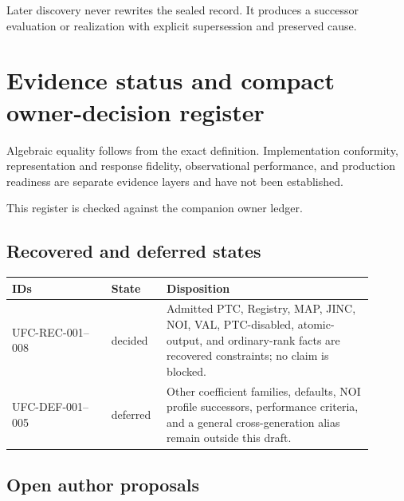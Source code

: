 Later discovery never rewrites the sealed record. It produces a successor
evaluation or realization with explicit supersession and preserved cause.

\section{Evidence status and compact owner-decision register}

Algebraic equality follows from the exact definition. Implementation
conformity, representation and response fidelity, observational performance,
and production readiness are separate evidence layers and have not been
established.

This register is checked against the companion owner ledger.

\subsection*{Recovered and deferred states}

\begin{center}
\begin{tabular}{p{0.25\linewidth}p{0.13\linewidth}p{0.52\linewidth}}
\toprule
IDs & State & Disposition\\
\midrule
UFC-REC-001--008 & decided & Admitted PTC, Registry, MAP, JINC, NOI, VAL,
PTC-disabled, atomic-output, and ordinary-rank facts are recovered
constraints; no claim is blocked.\\
UFC-DEF-001--005 & deferred & Other coefficient families, defaults, NOI
profile successors, performance criteria, and a general cross-generation
alias remain outside this draft.\\
\bottomrule
\end{tabular}
\end{center}

\subsection*{Open author proposals}

